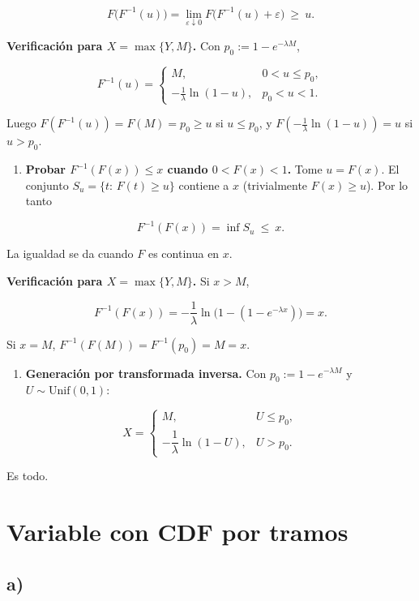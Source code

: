 \documentclass[11pt]{article}
\providecommand{\tightlist}{%
      \setlength{\itemsep}{0pt}\setlength{\parskip}{0pt}}
\begin{document}
\[
F\!\big(F^{-1}(u)\big)=\lim_{\varepsilon\downarrow0}F\big(F^{-1}(u)+\varepsilon\big)\ \ge\ u.
\]

\textbf{Verificación para \(X=\max\{Y,M\}\).} Con
\(p_0:=1-e^{-\lambda M}\),

\[
F^{-1}(u)=
\begin{cases}
M,& 0<u\le p_0,\\
-\frac1\lambda\ln(1-u),& p_0<u<1.
\end{cases}
\]

Luego \(F(F^{-1}(u))=F(M)=p_0\ge u\) si \(u\le p_0\), y
\(F(-\tfrac1\lambda\ln(1-u))=u\) si \(u>p_0\).

\begin{enumerate}
\def\labelenumi{\alph{enumi})}
\setcounter{enumi}{3}
\tightlist
\item
  \textbf{Probar \(F^{-1}(F(x))\le x\) cuando \(0<F(x)<1\).} Tome
  \(u=F(x)\). El conjunto \(S_u=\{t:\,F(t)\ge u\}\) contiene a \(x\)
  (trivialmente \(F(x)\ge u\)). Por lo tanto
\end{enumerate}

\[
F^{-1}(F(x))=\inf S_u\ \le\ x.
\]

La igualdad se da cuando \(F\) es continua en \(x\).

\textbf{Verificación para \(X=\max\{Y,M\}\).} Si \(x>M\),

\[
F^{-1}(F(x))=-\frac1\lambda\ln\!\big(1-(1-e^{-\lambda x})\big)=x.
\]

Si \(x=M\), \(F^{-1}(F(M))=F^{-1}(p_0)=M=x\).

\begin{enumerate}
\def\labelenumi{\alph{enumi})}
\setcounter{enumi}{4}
\tightlist
\item
  \textbf{Generación por transformada inversa.} Con
  \(p_0:=1-e^{-\lambda M}\) y \(U\sim\mathrm{Unif}(0,1)\):
\end{enumerate}

\[
X=
\begin{cases}
M, & U\le p_0,\\[4pt]
-\dfrac1\lambda\ln(1-U), & U>p_0.
\end{cases}
\]

Es todo.

    \hypertarget{variable-con-cdf-por-tramos}{%
\section{Variable con CDF por
tramos}\label{variable-con-cdf-por-tramos}}

    \hypertarget{a}{%
\subsection{a)}\label{a}}
\end{document}
